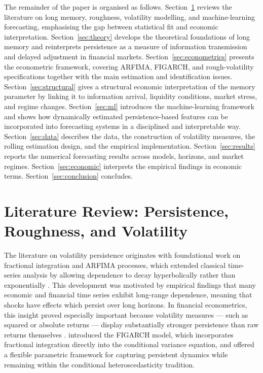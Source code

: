 \documentclass[11pt,a4paper]{article}
\begin{document}
The remainder of the paper is organised as follows.
Section~\ref{sec:literature} reviews the literature on long memory,
roughness, volatility modelling, and machine-learning forecasting,
emphasising the gap between statistical fit and economic interpretation.
Section~\ref{sec:theory} develops the theoretical foundations of long
memory and reinterprets persistence as a measure of information
transmission and delayed adjustment in financial markets.
Section~\ref{sec:econometrics} presents the econometric framework,
covering ARFIMA, FIGARCH, and rough-volatility specifications together with
the main estimation and identification issues.
Section~\ref{sec:structural} gives a structural economic interpretation of
the memory parameter by linking it to information arrival, liquidity
conditions, market stress, and regime changes.
Section~\ref{sec:ml} introduces the machine-learning framework and shows
how dynamically estimated persistence-based features can be incorporated
into forecasting systems in a disciplined and interpretable way.
Section~\ref{sec:data} describes the data, the construction of volatility
measures, the rolling estimation design, and the empirical implementation.
Section~\ref{sec:results} reports the numerical forecasting results across
models, horizons, and market regimes.
Section~\ref{sec:economic} interprets the empirical findings in economic
terms.
Section~\ref{sec:conclusion} concludes.

\section{Literature Review: Persistence, Roughness, and Volatility}
\label{sec:literature}

The literature on volatility persistence originates with foundational work
on fractional integration and ARFIMA processes, which extended classical
time-series analysis by allowing dependence to decay hyperbolically rather
than exponentially \citep{granger1980introduction,hosking1981fractional}.
This development was motivated by empirical findings that many economic
and financial time series exhibit long-range dependence, meaning that
shocks have effects which persist over long horizons. In financial
econometrics, this insight proved especially important because volatility
measures --- such as squared or absolute returns --- display substantially
stronger persistence than raw returns themselves
\citep{ding1993long}. \citet{baillie1996fractionally} introduced the
FIGARCH model, which incorporates fractional integration directly into the
conditional variance equation, and offered a flexible parametric framework
for capturing persistent dynamics while remaining within the conditional
heteroscedasticity tradition.
\end{document}
